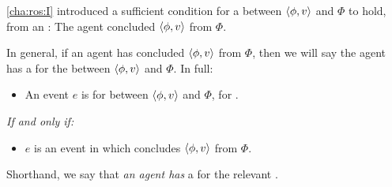\begin{note}
  \autoref{cha:ros:I} introduced a sufficient condition for a \ros{} between \(\langle \phi, v \rangle\) and \(\Phi\) to hold, from an \agpe{}:
  The agent concluded \(\langle \phi, v \rangle\) from \(\Phi\).

  In general, if an agent has concluded \(\langle \phi, v \rangle\) from \(\Phi\), then we will say the agent has a \wit{} for the \ros{} between \(\langle \phi, v \rangle\) and \(\Phi\).
  In full:

  \begin{definition}%
    \label{def:witnessing}%
    \vspace{-\baselineskip}
    \begin{itemize}
    \item
      An event \(e\) is \emph{} for \ros{} between \(\langle \phi, v \rangle\) and \(\Phi\), for \vAgent{}.
    \end{itemize}

    \emph{If and only if:}

    \begin{itemize}
    \item
      \(e\) is an event in which \vAgent{} concludes \(\langle \phi, v \rangle\) from \(\Phi\).
    \end{itemize}
    \vspace{-\baselineskip}
  \end{definition}

  Shorthand, we say that \emph{an agent has} a  for the relevant \ros{}.
\end{note}

